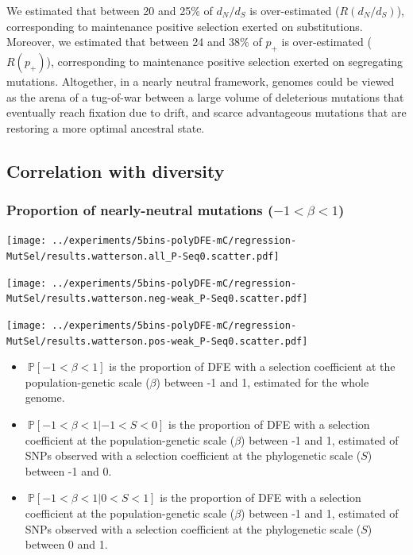 \documentclass{article}
\newcommand{\proba}{\mathbb{P}}
\newcommand{\dn}{d_N}
\newcommand{\ds}{d_S}
\newcommand{\dnds}{\dn / \ds}
\newcommand{\Sphy}{S}
\newcommand{\divWeakDel}{-1 < \Sphy < 0}
\newcommand{\divWeakAdv}{0 < \Sphy < 1}
\newcommand{\Spop}{\beta}
\newcommand{\polyNeutral}{-1 < \Spop < 1}
\begin{document}
    We estimated that between 20 and 25\% of $\dnds$ is over-estimated ($R(\dnds)$), corresponding to maintenance positive selection exerted on substitutions.
    Moreover, we estimated that between 24 and 38\% of $p_+$ is over-estimated ($R(p_+)$), corresponding to maintenance positive selection exerted on segregating mutations.
    Altogether, in a nearly neutral framework, genomes could be viewed as the arena of a tug-of-war between a large volume of deleterious mutations that eventually reach fixation due to drift, and scarce advantageous mutations that are restoring a more optimal ancestral state.

    \newpage

    \subsection{Correlation with diversity}

    \subsubsection{Proportion of nearly-neutral mutations ($\polyNeutral$)}\label{subsec:proportion-nearly-neutral-mutations}
    \begin{minipage}{0.32\linewidth}
        \texttt{[image: ../experiments/5bins-polyDFE-mC/regression-MutSel/results.watterson.all\_P-Seq0.scatter.pdf]}
    \end{minipage}
    \begin{minipage}{0.32\linewidth}
        \texttt{[image: ../experiments/5bins-polyDFE-mC/regression-MutSel/results.watterson.neg-weak\_P-Seq0.scatter.pdf]}
    \end{minipage}
    \begin{minipage}{0.32\linewidth}
        \texttt{[image: ../experiments/5bins-polyDFE-mC/regression-MutSel/results.watterson.pos-weak\_P-Seq0.scatter.pdf]}
    \end{minipage}
    \begin{itemize}
        \item $\ \proba [ \polyNeutral ]$ is the proportion of DFE with a selection coefficient at the population-genetic scale ($\Spop$) between -1 and 1, estimated for the whole genome.
        \item $\ \proba [ \polyNeutral | \divWeakDel]$ is the proportion of DFE with a selection coefficient at the population-genetic scale ($\Spop$) between -1 and 1, estimated of SNPs observed with a selection coefficient at the phylogenetic scale ($\Sphy$) between -1 and 0.
        \item $\ \proba [ \polyNeutral | \divWeakAdv ]$ is the proportion of DFE with a selection coefficient at the population-genetic scale ($\Spop$) between -1 and 1, estimated of SNPs observed with a selection coefficient at the phylogenetic scale ($\Sphy$) between 0 and 1.
    \end{itemize}
\end{document}
